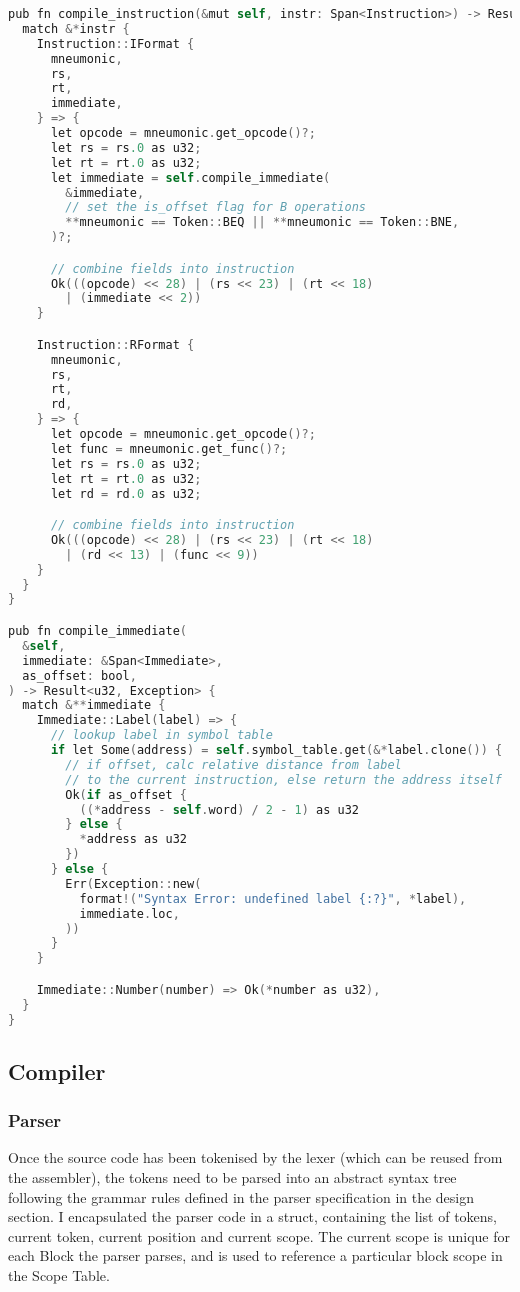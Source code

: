 \begin{lstlisting}[language=C]
pub fn compile_instruction(&mut self, instr: Span<Instruction>) -> Result<u32, Exception> {
  match &*instr {
    Instruction::IFormat {
      mneumonic,
      rs,
      rt,
      immediate,
    } => {
      let opcode = mneumonic.get_opcode()?;
      let rs = rs.0 as u32;
      let rt = rt.0 as u32;
      let immediate = self.compile_immediate(
        &immediate,
        // set the is_offset flag for B operations
        **mneumonic == Token::BEQ || **mneumonic == Token::BNE,
      )?;

      // combine fields into instruction
      Ok(((opcode) << 28) | (rs << 23) | (rt << 18) 
        | (immediate << 2))
    }

    Instruction::RFormat {
      mneumonic,
      rs,
      rt,
      rd,
    } => {
      let opcode = mneumonic.get_opcode()?;
      let func = mneumonic.get_func()?;
      let rs = rs.0 as u32;
      let rt = rt.0 as u32;
      let rd = rd.0 as u32;

      // combine fields into instruction
      Ok(((opcode) << 28) | (rs << 23) | (rt << 18) 
        | (rd << 13) | (func << 9))
    }
  }
}

pub fn compile_immediate(
  &self,
  immediate: &Span<Immediate>,
  as_offset: bool,
) -> Result<u32, Exception> {
  match &**immediate {
    Immediate::Label(label) => {
      // lookup label in symbol table
      if let Some(address) = self.symbol_table.get(&*label.clone()) {
        // if offset, calc relative distance from label 
        // to the current instruction, else return the address itself
        Ok(if as_offset {
          ((*address - self.word) / 2 - 1) as u32
        } else {
          *address as u32
        })
      } else {
        Err(Exception::new(
          format!("Syntax Error: undefined label {:?}", *label),
          immediate.loc,
        ))
      }
    }

    Immediate::Number(number) => Ok(*number as u32),
  }
}
\end{lstlisting}

\subsection{Compiler}
\subsubsection{Parser}
Once the source code has been tokenised by the lexer (which can be reused from the assembler), the tokens need to be parsed into an abstract syntax tree following the grammar rules defined in the parser specification in the design section. I encapsulated the parser code in a struct, containing the list of tokens, current token, current position and current scope. The current scope is unique for each Block the parser parses, and is used to reference a particular block scope in the Scope Table. 


